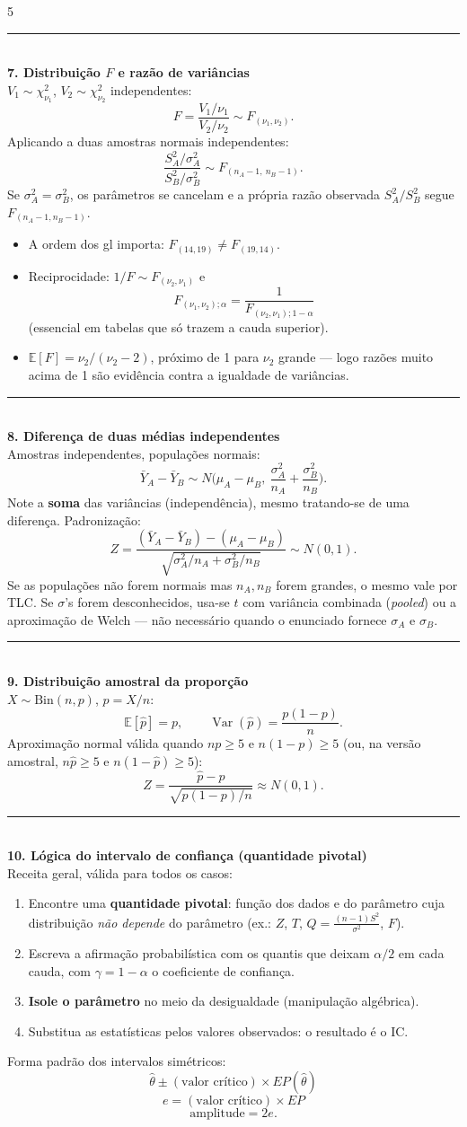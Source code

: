 \documentclass[a4paper,8pt]{extarticle}
\newcommand{\tit}[1]{\vspace{2pt}\textcolor{azul}{\rule{\linewidth}{0.6pt}}\\[1pt]\textbf{\textcolor{azul}{#1}}\\[1pt]}
\newcommand{\E}{\mathbb{E}}
\newcommand{\Var}{\operatorname{Var}}
\begin{document}
\begin{multicols*}{5}
\tit{7. Distribuição $F$ e razão de variâncias}
$V_1\sim\chi^2_{\nu_1}$, $V_2\sim\chi^2_{\nu_2}$ independentes:
\[F=\frac{V_1/\nu_1}{V_2/\nu_2}\sim F_{(\nu_1,\nu_2)} .\]
Aplicando a duas amostras normais independentes:
\[\frac{S_A^2/\sigma_A^2}{S_B^2/\sigma_B^2}\sim F_{(n_A-1,\ n_B-1)} .\]
Se $\sigma_A^2=\sigma_B^2$, os parâmetros se cancelam e a própria razão observada $S_A^2/S_B^2$ segue $F_{(n_A-1,n_B-1)}$.
\begin{itemize}
\item A ordem dos gl importa: $F_{(14,19)}\ne F_{(19,14)}$.
\item Reciprocidade: $1/F\sim F_{(\nu_2,\nu_1)}$ e
\[F_{(\nu_1,\nu_2);\alpha}=\frac{1}{F_{(\nu_2,\nu_1);1-\alpha}}\]
(essencial em tabelas que só trazem a cauda superior).
\item $\E[F]=\nu_2/(\nu_2-2)$, próximo de 1 para $\nu_2$ grande — logo razões muito acima de 1 são evidência contra a igualdade de variâncias.
\end{itemize}

\tit{8. Diferença de duas médias independentes}
Amostras independentes, populações normais:
\[\bar Y_A-\bar Y_B\sim N\!\Big(\mu_A-\mu_B,\ \frac{\sigma_A^2}{n_A}+\frac{\sigma_B^2}{n_B}\Big).\]
Note a \textbf{soma} das variâncias (independência), mesmo tratando-se de uma diferença. Padronização:
\[Z=\frac{(\bar Y_A-\bar Y_B)-(\mu_A-\mu_B)}{\sqrt{\sigma_A^2/n_A+\sigma_B^2/n_B}}\sim N(0,1).\]
Se as populações não forem normais mas $n_A,n_B$ forem grandes, o mesmo vale por TLC. Se $\sigma$'s forem desconhecidos, usa-se $t$ com variância combinada (\emph{pooled}) ou a aproximação de Welch — não necessário quando o enunciado fornece $\sigma_A$ e $\sigma_B$.

\tit{9. Distribuição amostral da proporção}
$X\sim\text{Bin}(n,p)$, $\hat p=X/n$:
\[\E[\hat p]=p,\qquad \Var(\hat p)=\frac{p(1-p)}{n}.\]
Aproximação normal válida quando $np\ge5$ e $n(1-p)\ge5$ (ou, na versão amostral, $n\hat p\ge5$ e $n(1-\hat p)\ge5$):
\[Z=\frac{\hat p-p}{\sqrt{p(1-p)/n}}\approx N(0,1).\]

\tit{10. Lógica do intervalo de confiança (quantidade pivotal)}
Receita geral, válida para todos os casos:
\begin{enumerate}
\item Encontre uma \textbf{quantidade pivotal}: função dos dados e do parâmetro cuja distribuição \emph{não depende} do parâmetro (ex.: $Z$, $T$, $Q=\frac{(n-1)S^2}{\sigma^2}$, $F$).
\item Escreva a afirmação probabilística com os quantis que deixam $\alpha/2$ em cada cauda, com $\gamma=1-\alpha$ o coeficiente de confiança.
\item \textbf{Isole o parâmetro} no meio da desigualdade (manipulação algébrica).
\item Substitua as estatísticas pelos valores observados: o resultado é o IC.
\end{enumerate}
Forma padrão dos intervalos simétricos:
\[\hat\theta \pm (\text{valor crítico})\times EP(\hat\theta)\]
\[e=(\text{valor crítico})\times EP\]
\[\text{amplitude}=2e .\]


\end{multicols*}
\end{document}
